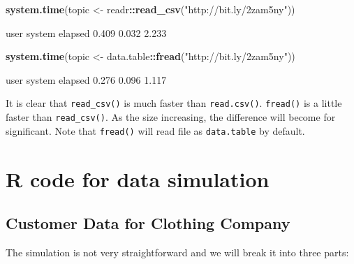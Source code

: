 \documentclass[12pt,]{krantz}
\makeatletter
\newenvironment{Shaded}{\begin{snugshade}}{\end{snugshade}}
\newcommand{\KeywordTok}[1]{\textcolor[rgb]{0.27,0.27,0.27}{\textbf{#1}}}
\newcommand{\NormalTok}[1]{#1}
\newcommand{\OperatorTok}[1]{\textcolor[rgb]{0.43,0.43,0.43}{\textbf{#1}}}
\newcommand{\StringTok}[1]{\textcolor[rgb]{0.5,0.5,0.5}{#1}}
\newenvironment{kframe}{%
\medskip{}
\setlength{\fboxsep}{.8em}
 \def\at@end@of@kframe{}%
 \ifinner\ifhmode%
  \def\at@end@of@kframe{\end{minipage}}%
  \begin{minipage}{\columnwidth}%
 \fi\fi%
 \def\FrameCommand##1{\hskip\@totalleftmargin \hskip-\fboxsep
 \colorbox{shadecolor}{##1}\hskip-\fboxsep
     \hskip-\linewidth \hskip-\@totalleftmargin \hskip\columnwidth}%
 \MakeFramed {\advance\hsize-\width
   \@totalleftmargin\z@ \linewidth\hsize
   \@setminipage}}%
 {\par\unskip\endMakeFramed%
 \at@end@of@kframe}
\renewenvironment{Shaded}{\begin{kframe}}{\end{kframe}}
\makeatother
\begin{document}
\begin{Shaded}
\begin{Highlighting}[]
\KeywordTok{system.time}\NormalTok{(topic <-}\StringTok{ }\NormalTok{readr}\OperatorTok{::}\KeywordTok{read_csv}\NormalTok{(}\StringTok{"http://bit.ly/2zam5ny"}\NormalTok{))}
\end{Highlighting}
\end{Shaded}

\begin{Shaded}
\begin{Highlighting}[]
\NormalTok{   user  system elapsed }
\NormalTok{  0.409   0.032   2.233 }
\end{Highlighting}
\end{Shaded}

\begin{Shaded}
\begin{Highlighting}[]
\KeywordTok{system.time}\NormalTok{(topic <-}\StringTok{ }\NormalTok{data.table}\OperatorTok{::}\KeywordTok{fread}\NormalTok{(}\StringTok{"http://bit.ly/2zam5ny"}\NormalTok{))}
\end{Highlighting}
\end{Shaded}

\begin{Shaded}
\begin{Highlighting}[]
\NormalTok{   user  system elapsed }
\NormalTok{  0.276   0.096   1.117 }
\end{Highlighting}
\end{Shaded}

It is clear that \texttt{read\_csv()} is much faster than \texttt{read.csv()}. \texttt{fread()} is a little faster than \texttt{read\_csv()}. As the size increasing, the difference will become for significant. Note that \texttt{fread()} will read file as \texttt{data.table} by default.

\hypertarget{r-code-for-data-simulation}{%
\chapter{R code for data simulation}\label{r-code-for-data-simulation}}

\hypertarget{appendixdata1}{%
\section{Customer Data for Clothing Company}\label{appendixdata1}}

The simulation is not very straightforward and we will break it into three parts:
\end{document}
